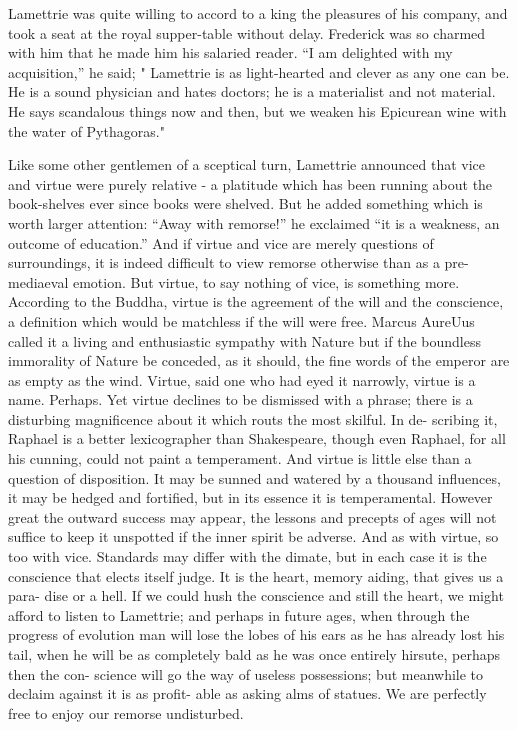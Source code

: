 \documentclass[]{book}
\begin{document}
Lamettrie was quite willing to accord to a king the pleasures of his
company, and took a seat at the royal supper-table without delay.
Frederick was so charmed with him that he made him his salaried reader.
``I am delighted with my acquisition,'' he said; " Lamettrie is as
light-hearted and clever as any one can be. He is a sound physician and
hates doctors; he is a materialist and not material. He says scandalous
things now and then, but we weaken his Epicurean wine with the water of
Pythagoras."

Like some other gentlemen of a sceptical turn, Lamettrie announced that
vice and virtue were purely relative - a platitude which has been
running about the book-shelves ever since books were shelved. But he
added something which is worth larger attention: ``Away with remorse!''
he exclaimed ``it is a weakness, an outcome of education.'' And if
virtue and vice are merely questions of surroundings, it is indeed
difficult to view remorse otherwise than as a pre-mediaeval emotion. But
virtue, to say nothing of vice, is something more. According to the
Buddha, virtue is the agreement of the will and the conscience, a
definition which would be matchless if the will were free. Marcus
AureUus called it a living and enthusiastic sympathy with Nature but if
the boundless immorality of Nature be conceded, as it should, the fine
words of the emperor are as empty as the wind. Virtue, said one who had
eyed it narrowly, virtue is a name. Perhaps. Yet virtue declines to be
dismissed with a phrase; there is a disturbing magnificence about it
which routs the most skilful. In de- scribing it, Raphael is a better
lexicographer than Shakespeare, though even Raphael, for all his
cunning, could not paint a temperament. And virtue is little else than a
question of disposition. It may be sunned and watered by a thousand
influences, it may be hedged and fortified, but in its essence it is
temperamental. However great the outward success may appear, the lessons
and precepts of ages will not suffice to keep it unspotted if the inner
spirit be adverse. And as with virtue, so too with vice. Standards may
differ with the dimate, but in each case it is the conscience that
elects itself judge. It is the heart, memory aiding, that gives us a
para- dise or a hell. If we could hush the conscience and still the
heart, we might afford to listen to Lamettrie; and perhaps in future
ages, when through the progress of evolution man will lose the lobes of
his ears as he has already lost his tail, when he will be as completely
bald as he was once entirely hirsute, perhaps then the con- science will
go the way of useless possessions; but meanwhile to declaim against it
is as profit- able as asking alms of statues. We are perfectly free to
enjoy our remorse undisturbed.
\end{document}
